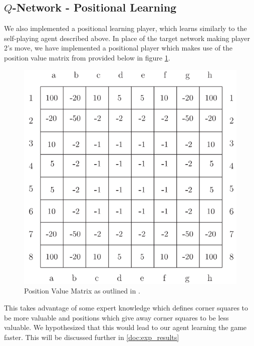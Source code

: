 \documentclass{article}
\begin{document}
\subsection{\label{doc:positional}$Q$-Network - Positional Learning}
We also implemented a positional learning player, which learns similarly to the self-playing agent described above. In place of the target network making player 2's move, we have implemented a positional player which makes use of the position value matrix from \cite{vanEck2008} provided below in figure \ref{fig:pos_vals}.

\begin{figure}[ht]
\centering
\includegraphics[width=0.6\linewidth]{figures/position_vals.png}
\caption{\label{fig:pos_vals}Position Value Matrix as outlined in \cite{vanEck2008}.}
\end{figure}

This takes advantage of some expert knowledge which defines corner squares to be more valuable and positions which give away corner squares to be less valuable. We hypothesized that this would lead to our agent learning the game faster. This will be discussed further in \ref{doc:exp_results}
\end{document}
